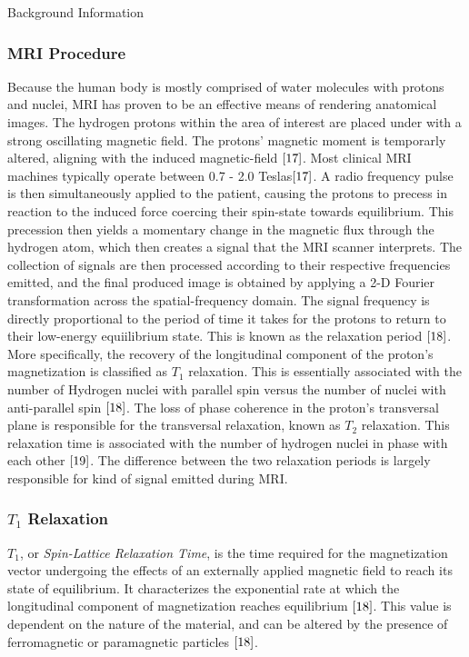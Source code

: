 \documentclass[a4paper,12pt]{article}
\begin{document}
\begin{section}{Background Information}
\subsubsection{MRI Procedure}
Because the human body is mostly comprised of water molecules with protons and nuclei, MRI has proven to be an effective means of rendering anatomical images. The hydrogen protons within the area of interest are placed under with a strong oscillating magnetic field. The protons' magnetic moment is temporarly altered, aligning with the induced magnetic-field $\cite{17}$. 
Most clinical MRI machines typically operate between 0.7 - 2.0 Teslas$\cite{17}$. 
A radio frequency pulse is then simultaneously applied to the patient, causing the protons to precess in reaction to the induced force coercing their spin-state towards equilibrium. 
This precession then yields a momentary change in the magnetic flux through the hydrogen atom, which then creates a signal that the MRI scanner interprets. The collection of signals are then processed according to their respective frequencies emitted, and the final produced image is obtained by applying a 2-D Fourier transformation across the spatial-frequency domain. 
The signal frequency is directly proportional to the period of time it takes for the protons to return to their low-energy equiilibrium state. This is known as the relaxation period $\cite{18}$. 
More specifically, the recovery of the longitudinal component of the proton's magnetization is classified as $T_1$ relaxation. This is essentially associated with the number of Hydrogen nuclei with parallel spin versus the number of nuclei with anti-parallel spin $\cite{18}$. 
The loss of phase coherence in the proton's transversal plane is responsible for the transversal relaxation, known as $T_2$ relaxation. This relaxation time is associated with the number of hydrogen nuclei in phase with each other $\cite{19}$. 
The difference between the two relaxation periods is largely responsible for kind of signal emitted during MRI.

\subsubsection{$T_1$ Relaxation}
$T_1$, or {\em Spin-Lattice Relaxation Time}, is the time required for the magnetization vector undergoing the effects of an externally applied magnetic field to reach its state of equilibrium. It characterizes the exponential rate at which the longitudinal component of magnetization reaches equilibrium $\cite{18}$. This value is dependent on the nature of the material, and can be altered by the presence of ferromagnetic or paramagnetic particles $\cite{18}$. 


\end{section}
\end{document}
